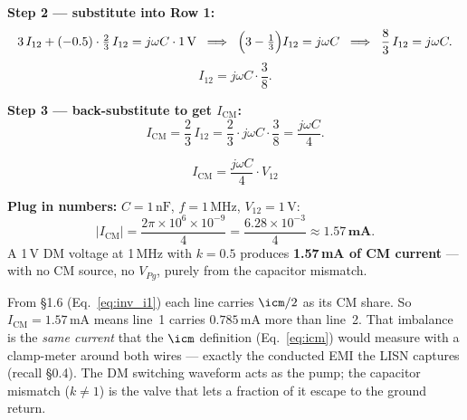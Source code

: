 \textbf{Step 2 — substitute into Row 1:}
\[
    3\,I_{12} + (-0.5)\cdot\tfrac{2}{3}\,I_{12}
    = j\omega C \cdot 1\,\mathrm{V}
    \;\;\Longrightarrow\;\;
    \Bigl(3 - \tfrac{1}{3}\Bigr)I_{12} = j\omega C
    \;\;\Longrightarrow\;\;
    \frac{8}{3}\,I_{12} = j\omega C.
\]
\[
    I_{12} = j\omega C \cdot \frac{3}{8}.
\]

\textbf{Step 3 — back-substitute to get $I_{\mathrm{CM}}$:}
\[
    I_{\mathrm{CM}}
    = \frac{2}{3}\,I_{12}
    = \frac{2}{3} \cdot j\omega C \cdot \frac{3}{8}
    = \frac{j\omega C}{4}.
\]

\begin{eqnbox}[CM Current Generated by a Pure DM Source ($k=0.5$, $N=2$)]
\begin{equation}
    I_{\mathrm{CM}} = \frac{j\omega C}{4}\cdot V_{12}
    \label{eq:ICM_result}
\end{equation}
\end{eqnbox}

\textbf{Plug in numbers:} $C = 1\,\text{nF}$, $f = 1\,\text{MHz}$,
$V_{12} = 1\,\text{V}$:
\[
|I_{\mathrm{CM}}|
= \frac{2\pi \times 10^6 \times 10^{-9}}{4}
= \frac{6.28 \times 10^{-3}}{4}
\approx \mathbf{1.57\,\text{mA}}.
\]
A 1\,V DM voltage at 1\,MHz with $k = 0.5$ produces
\textbf{1.57\,mA of CM current} — with no CM source, no $V_{Pg}$,
purely from the capacitor mismatch.

\begin{warningbox}
From \S1.6 (Eq.~\ref{eq:inv_i1}) each line carries $\icm/2$ as its
CM share.  So $I_{\mathrm{CM}} = 1.57\,\text{mA}$ means line~1
carries $0.785\,\text{mA}$ more than line~2.  That imbalance is the
\emph{same current} that the $\icm$ definition (Eq.~\ref{eq:icm})
would measure with a clamp-meter around both wires — exactly the
conducted EMI the LISN captures (recall \S0.4).
The DM switching waveform acts as the pump; the capacitor
mismatch ($k \neq 1$) is the valve that lets a fraction of it
escape to the ground return.
\end{warningbox}

